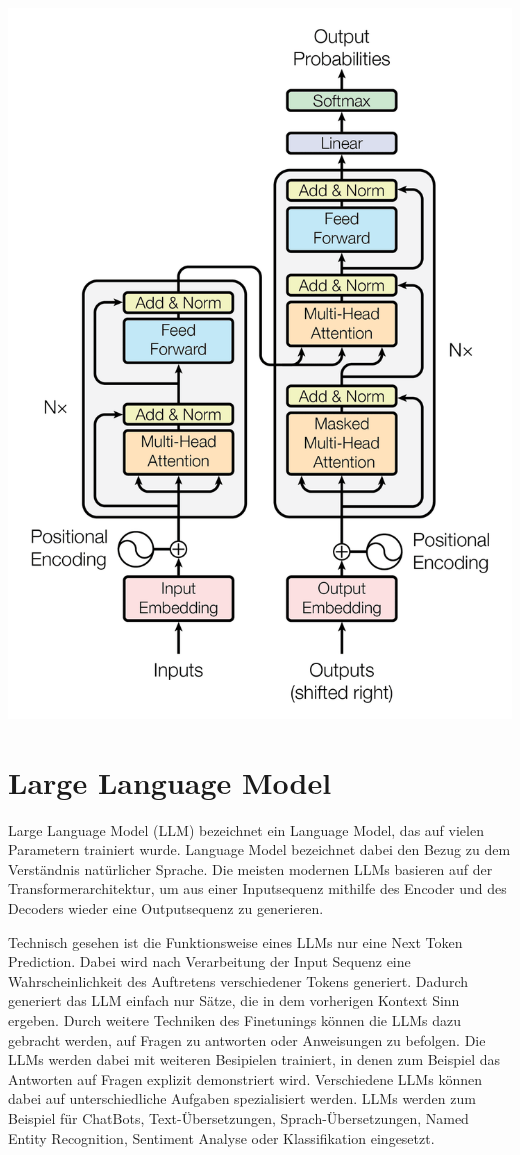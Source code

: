 \includegraphics[width=\linewidth]{figures/transformer_architecture.png}


\section{Large Language Model}

Large Language Model (LLM) bezeichnet ein Language Model, das auf vielen Parametern trainiert wurde. 
Language Model bezeichnet dabei den Bezug zu dem Verständnis natürlicher Sprache.
Die meisten modernen LLMs basieren auf der Transformerarchitektur, um aus einer Inputsequenz mithilfe des Encoder und des Decoders wieder eine Outputsequenz zu generieren.


Technisch gesehen ist die Funktionsweise eines LLMs nur eine Next Token Prediction.
Dabei wird nach Verarbeitung der Input Sequenz eine Wahrscheinlichkeit des Auftretens verschiedener Tokens generiert.
Dadurch generiert das LLM einfach nur Sätze, die in dem vorherigen Kontext Sinn ergeben.
Durch weitere Techniken des Finetunings können die LLMs dazu gebracht werden, auf Fragen zu antworten oder Anweisungen zu befolgen.
Die LLMs werden dabei mit weiteren Besipielen trainiert, in denen zum Beispiel das Antworten auf Fragen explizit demonstriert wird.
Verschiedene LLMs können dabei auf unterschiedliche Aufgaben spezialisiert werden.
LLMs werden zum Beispiel für ChatBots, Text-Übersetzungen, Sprach-Übersetzungen, Named Entity Recognition, Sentiment Analyse oder Klassifikation eingesetzt.



